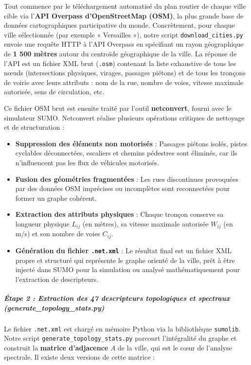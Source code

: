 \documentclass[10pt, a4paper]{article}
\providecommand{\tightlist}{}
\begin{document}
Tout commence par le téléchargement automatisé du plan routier de chaque
ville cible via l'\textbf{API Overpass d'OpenStreetMap (OSM)}, la plus
grande base de données cartographiques participative du monde.
Concrètement, pour chaque ville sélectionnée (par exemple « Versailles
»), notre script \texttt{download\_cities.py} envoie une requête HTTP à
l'API Overpass en spécifiant un rayon géographique de \textbf{1 500
mètres} autour du centroïde géographique de la ville. La réponse de
l'API est un fichier XML brut (\texttt{.osm}) contenant la liste
exhaustive de tous les nœuds (intersections physiques, virages, passages
piétons) et de tous les tronçons de voirie avec leurs attributs : nom de
la rue, nombre de voies, vitesse maximale autorisée, sens de
circulation, etc.

Ce fichier OSM brut est ensuite traité par l'outil \textbf{netconvert},
fourni avec le simulateur SUMO. Netconvert réalise plusieurs opérations
critiques de nettoyage et de structuration :

\begin{itemize}
\tightlist
\item
  \textbf{Suppression des éléments non motorisés} : Passages piétons
  isolés, pistes cyclables déconnectées, escaliers et chemins pédestres
  sont éliminés, car ils n'influencent pas les flux de véhicules
  motorisés.
\item
  \textbf{Fusion des géométries fragmentées} : Les rues discontinues
  provoquées par des données OSM imprécises ou incomplètes sont
  reconnectées pour former un graphe cohérent.
\item
  \textbf{Extraction des attributs physiques} : Chaque tronçon conserve
  sa longueur physique \(L_{ij}\) (en mètres), sa vitesse maximale
  autorisée \(W_{ij}\) (en m/s) et son nombre de voies \(C_{ij}\).
\item
  \textbf{Génération du fichier \texttt{.net.xml}} : Le résultat final
  est un fichier XML propre et structuré qui représente le graphe
  orienté de la ville, prêt à être injecté dans SUMO pour la simulation
  ou analysé mathématiquement pour l'extraction de descripteurs.
\end{itemize}

\subparagraph{Étape 2 : Extraction des 47 descripteurs topologiques et
spectraux
(generate\_topology\_stats.py)}\label{uxe9tape-2-extraction-des-47-descripteurs-topologiques-et-spectraux-generate_topology_stats.py}

Le fichier \texttt{.net.xml} est chargé en mémoire Python via la
bibliothèque \texttt{sumolib}. Notre script
\texttt{generate\_topology\_stats.py} parcourt l'intégralité du graphe
et construit la \textbf{matrice d'adjacence} \(A\) de la ville, qui est
le cœur de l'analyse spectrale. Il existe deux versions de cette matrice
:
\end{document}
